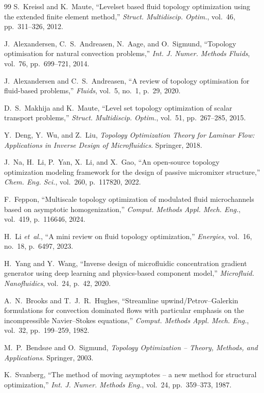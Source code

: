 \begin{thebibliography}{99}
S.~Kreissl and K.~Maute,
``Levelset based fluid topology optimization using the extended finite element method,''
\emph{Struct. Multidiscip. Optim.}, vol.~46, pp.~311--326, 2012.

J.~Alexandersen, C.~S.~Andreasen, N.~Aage, and O.~Sigmund,
``Topology optimisation for natural convection problems,''
\emph{Int. J. Numer. Methods Fluids}, vol.~76, pp.~699--721, 2014.

J.~Alexandersen and C.~S.~Andreasen,
``A review of topology optimisation for fluid-based problems,''
\emph{Fluids}, vol.~5, no.~1, p.~29, 2020.

D.~S.~Makhija and K.~Maute,
``Level set topology optimization of scalar transport problems,''
\emph{Struct. Multidiscip. Optim.}, vol.~51, pp.~267--285, 2015.

Y.~Deng, Y.~Wu, and Z.~Liu,
\emph{Topology Optimization Theory for Laminar Flow: Applications in Inverse Design of Microfluidics}. Springer, 2018.

J.~Na, H.~Li, P.~Yan, X.~Li, and X.~Gao,
``An open-source topology optimization modeling framework for the design of passive micromixer structure,''
\emph{Chem. Eng. Sci.}, vol.~260, p.~117820, 2022.

F.~Feppon,
``Multiscale topology optimization of modulated fluid microchannels based on asymptotic homogenization,''
\emph{Comput. Methods Appl. Mech. Eng.}, vol.~419, p.~116646, 2024.

H.~Li \emph{et~al.},
``A mini review on fluid topology optimization,''
\emph{Energies}, vol.~16, no.~18, p.~6497, 2023.

H.~Yang and Y.~Wang,
``Inverse design of microfluidic concentration gradient generator using deep learning and physics-based component model,''
\emph{Microfluid. Nanofluidics}, vol.~24, p.~42, 2020.

A.~N.~Brooks and T.~J.~R.~Hughes,
``Streamline upwind/{P}etrov--{G}alerkin formulations for convection dominated flows with particular emphasis on the incompressible {N}avier--{S}tokes equations,''
\emph{Comput. Methods Appl. Mech. Eng.}, vol.~32, pp.~199--259, 1982.

M.~P.~Bends{\o}e and O.~Sigmund,
\emph{Topology Optimization -- Theory, Methods, and Applications}. Springer, 2003.

K.~Svanberg,
``The method of moving asymptotes -- a new method for structural optimization,''
\emph{Int. J. Numer. Methods Eng.}, vol.~24, pp.~359--373, 1987.


\end{thebibliography}
